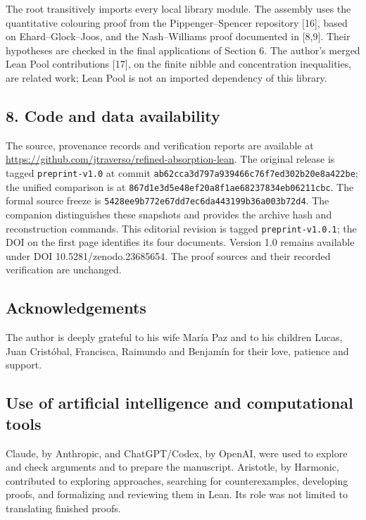 \documentclass[english,11pt,a4paper]{article}
\begin{document}
The root transitively imports every local library module. The assembly uses the quantitative colouring proof from the Pippenger--Spencer repository {[}16{]}, based on Ehard--Glock--Joos, and the Nash--Williams proof documented in {[}8,9{]}. Their hypotheses are checked in the final applications of Section 6. The author's merged Lean Pool contributions {[}17{]}, on the finite nibble and concentration inequalities, are related work; Lean Pool is not an imported dependency of this library.

\subsection{8. Code and data availability}\label{code-and-data-availability}

The source, provenance records and verification reports are available at \url{https://github.com/jtraverso/refined-absorption-lean}. The original release is tagged \texttt{preprint-v1.\allowbreak{}0} at commit \texttt{ab62cca3\allowbreak{}d797a939\allowbreak{}466c76f7\allowbreak{}ed302b20\allowbreak{}e8a422be}; the unified comparison is at \texttt{867d1e3d\allowbreak{}5e48ef20\allowbreak{}a8f1ae68\allowbreak{}237834eb\allowbreak{}06211cbc}. The formal source freeze is \texttt{5428ee9b\allowbreak{}772e67dd\allowbreak{}7ec6da44\allowbreak{}3199b36a\allowbreak{}003b72d4}. The companion distinguishes these snapshots and provides the archive hash and reconstruction commands. This editorial revision is tagged \texttt{preprint-v1.\allowbreak{}0.\allowbreak{}1}; the DOI on the first page identifies its four documents. Version 1.0 remains available under DOI 10.5281/zenodo.23685654. The proof sources and their recorded verification are unchanged.

\subsection{Acknowledgements}\label{acknowledgements}

The author is deeply grateful to his wife María Paz and to his children Lucas, Juan Cristóbal, Francisca, Raimundo and Benjamín for their love, patience and support.

\subsection{Use of artificial intelligence and computational tools}\label{use-of-artificial-intelligence-and-computational-tools}

Claude, by Anthropic, and ChatGPT/Codex, by OpenAI, were used to explore and check arguments and to prepare the manuscript. Aristotle, by Harmonic, contributed to exploring approaches, searching for counterexamples, developing proofs, and formalizing and reviewing them in Lean. Its role was not limited to translating finished proofs.
\end{document}
